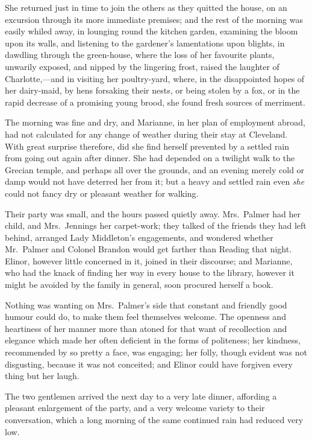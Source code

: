 She returned just in time to join the others
as they quitted the house, on an excursion through its
more immediate premises; and the rest of the morning was
easily whiled away, in lounging round the kitchen garden,
examining the bloom upon its walls, and listening to the
gardener's lamentations upon blights, in dawdling through
the green-house, where the loss of her favourite plants,
unwarily exposed, and nipped by the lingering frost,
raised the laughter of Charlotte,---and in visiting her
poultry-yard, where, in the disappointed hopes of her
dairy-maid, by hens forsaking their nests, or being
stolen by a fox, or in the rapid decrease of a promising
young brood, she found fresh sources of merriment.

The morning was fine and dry, and Marianne,
in her plan of employment abroad, had not calculated
for any change of weather during their stay at Cleveland.
With great surprise therefore, did she find herself prevented
by a settled rain from going out again after dinner.
She had depended on a twilight walk to the Grecian temple,
and perhaps all over the grounds, and an evening merely
cold or damp would not have deterred her from it;
but a heavy and settled rain even \emph{she} could not fancy dry
or pleasant weather for walking.

Their party was small, and the hours passed quietly away.
Mrs.\ Palmer had her child, and Mrs.\ Jennings her carpet-work;
they talked of the friends they had left behind,
arranged Lady Middleton's engagements, and wondered
whether Mr.\ Palmer and Colonel Brandon would get farther
than Reading that night.  Elinor, however little concerned
in it, joined in their discourse; and Marianne, who had
the knack of finding her way in every house to the library,
however it might be avoided by the family in general,
soon procured herself a book.

Nothing was wanting on Mrs.\ Palmer's side that constant
and friendly good humour could do, to make them feel
themselves welcome.  The openness and heartiness of her
manner more than atoned for that want of recollection
and elegance which made her often deficient in the forms
of politeness; her kindness, recommended by so pretty
a face, was engaging; her folly, though evident
was not disgusting, because it was not conceited;
and Elinor could have forgiven every thing but her laugh.

The two gentlemen arrived the next day to a very
late dinner, affording a pleasant enlargement of the party,
and a very welcome variety to their conversation, which a
long morning of the same continued rain had reduced very low.

